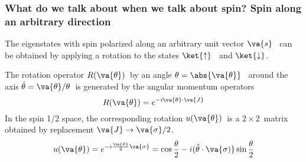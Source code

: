 \begin{frame}
\frametitle{What do we talk about when we talk about spin? Spin along an arbitrary direction}


The eigenstates with spin polarized along an arbitrary unit vector $\va{s}$~ 
can be obtained by applying a rotation to the states $\ket{\uparrow}$~ and $\ket{\downarrow}$.

 The rotation operator $R(\va{\theta})$~by an angle $\theta = \abs{\va{\theta}}$~
 around the axis $\hat{\theta} = \va{\theta}/\theta$~is generated by the angular momentum operators
 \[
 R(\va{\theta}) = e^{-i \va{\theta}\cdot \va{J}}
 \]
 In the spin 1/2 space, the corresponding rotation $u(\va{\theta})$~is a $2 \times 2$~matrix obtained
 by replacement $\va{J} \rightarrow \va{\sigma}/2$.
 \[
 u(\va{\theta}) = e^{-i \frac{\va{\theta}}{2}\va{\sigma}} = \cos{\frac{\theta}{2}} - i (\hat{\theta} \cdot \va{\sigma)}\sin{\frac{\theta}{2}}
 \]

\end{frame}